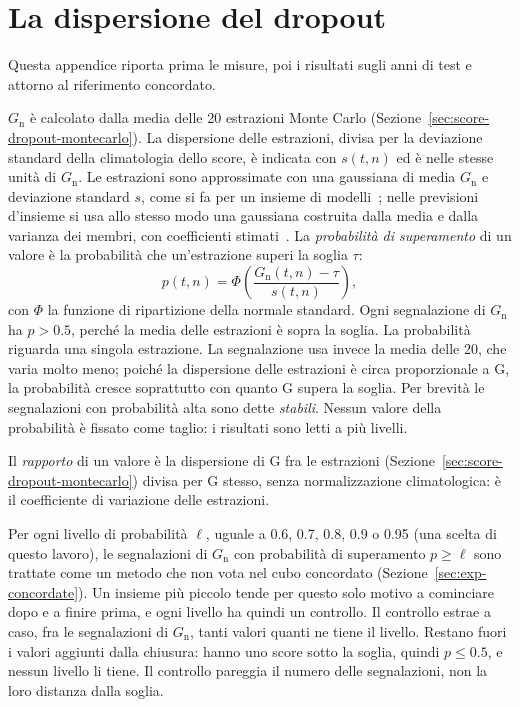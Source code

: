 \chapter{La dispersione del dropout}
\label{app:dropout}

Questa appendice riporta prima le misure, poi i risultati sugli anni di test e attorno al riferimento concordato.

$G_{\mathrm{n}}$ è calcolato dalla media delle 20 estrazioni Monte Carlo (Sezione~\ref{sec:score-dropout-montecarlo}). La dispersione delle estrazioni, divisa per la deviazione standard della climatologia dello score, è indicata con $s(t,n)$ ed è nelle stesse unità di $G_{\mathrm{n}}$. Le estrazioni sono approssimate con una gaussiana di media $G_{\mathrm{n}}$ e deviazione standard $s$, come si fa per un insieme di modelli~\cite{lakshminarayanan2017ensembles}; nelle previsioni d'insieme si usa allo stesso modo una gaussiana costruita dalla media e dalla varianza dei membri, con coefficienti stimati~\cite{gneiting2005emos}. La \emph{probabilità di superamento} di un valore è la probabilità che un'estrazione superi la soglia $\tau$:
\begin{equation}
p(t,n)=\Phi\!\left(\frac{G_{\mathrm{n}}(t,n)-\tau}{s(t,n)}\right),
\end{equation}
con $\Phi$ la funzione di ripartizione della normale standard. Ogni segnalazione di $G_{\mathrm{n}}$ ha $p>0.5$, perché la media delle estrazioni è sopra la soglia. La probabilità riguarda una singola estrazione. La segnalazione usa invece la media delle 20, che varia molto meno; poiché la dispersione delle estrazioni è circa proporzionale a G, la probabilità cresce soprattutto con quanto G supera la soglia. Per brevità le segnalazioni con probabilità alta sono dette \emph{stabili}. Nessun valore della probabilità è fissato come taglio: i risultati sono letti a più livelli.

Il \emph{rapporto} di un valore è la dispersione di G fra le estrazioni (Sezione~\ref{sec:score-dropout-montecarlo}) divisa per G stesso, senza normalizzazione climatologica: è il coefficiente di variazione delle estrazioni.

Per ogni livello di probabilità $\ell$, uguale a 0.6, 0.7, 0.8, 0.9 o 0.95 (una scelta di questo lavoro), le segnalazioni di $G_{\mathrm{n}}$ con probabilità di superamento $p\ge\ell$ sono trattate come un metodo che non vota nel cubo concordato (Sezione~\ref{sec:exp-concordate}). Un insieme più piccolo tende per questo solo motivo a cominciare dopo e a finire prima, e ogni livello ha quindi un controllo. Il controllo estrae a caso, fra le segnalazioni di $G_{\mathrm{n}}$, tanti valori quanti ne tiene il livello. Restano fuori i valori aggiunti dalla chiusura: hanno uno score sotto la soglia, quindi $p\le0.5$, e nessun livello li tiene. Il controllo pareggia il numero delle segnalazioni, non la loro distanza dalla soglia.

